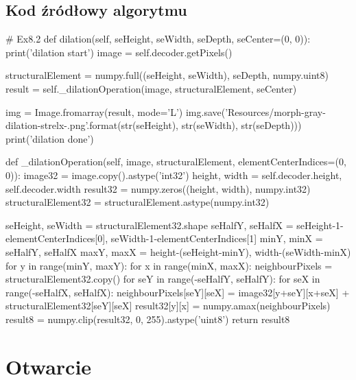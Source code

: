 \documentclass[a4paper,12pt]{book}
\begin{document}
\subsection{Kod źródłowy algorytmu}
\begin{python}
# Ex8.2
	def dilation(self, seHeight, seWidth, seDepth, seCenter=(0, 0)):
	print('dilation start')
	image = self.decoder.getPixels()
	
	structuralElement = numpy.full((seHeight, seWidth), seDepth, numpy.uint8)
	result = self._dilationOperation(image, structuralElement, seCenter)
	
	img = Image.fromarray(result, mode='L')
	img.save('Resources/morph-gray-dilation-strel{}x{}-{}.png'.format(str(seHeight), str(seWidth), str(seDepth)))
	print('dilation done')

def _dilationOperation(self, image, structuralElement, elementCenterIndices=(0, 0)):
	image32 = image.copy().astype('int32')
	height, width = self.decoder.height, self.decoder.width
	result32 = numpy.zeros((height, width), numpy.int32)
	structuralElement32 = structuralElement.astype(numpy.int32)
	
	seHeight, seWidth = structuralElement32.shape
	seHalfY, seHalfX = seHeight-1-elementCenterIndices[0], seWidth-1-elementCenterIndices[1]
	minY, minX = seHalfY, seHalfX
	maxY, maxX = height-(seHeight-minY), width-(seWidth-minX)
	for y in range(minY, maxY):
		for x in range(minX, maxX):
			neighbourPixels = structuralElement32.copy()
			for seY in range(-seHalfY, seHalfY):
				for seX in range(-seHalfX, seHalfX):
					neighbourPixels[seY][seX] = image32[y+seY][x+seX] + structuralElement32[seY][seX]
			result32[y][x] = numpy.amax(neighbourPixels)
	result8 = numpy.clip(result32, 0, 255).astype('uint8')
	return result8
\end{python}
\section{Otwarcie}
\end{document}
